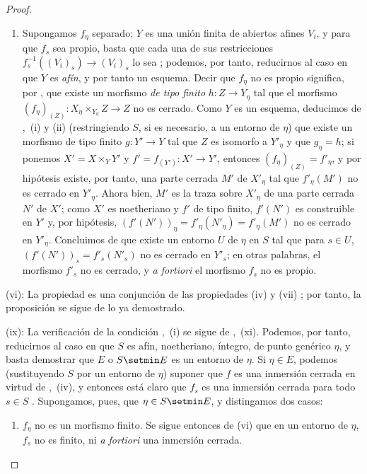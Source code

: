 \begin{proof}
\begin{enumerate}[label=\upshape{$\arabic{enumi}^\circ$}]
  \item Supongamos $f_\eta$ separado; $Y$ es una unión finita de abiertos afines $V_i$, y para que $f_s$ sea propio, basta que cada una de sus restricciones $f_s^{-1}((V_i)_s)\to(V_i)_s$ lo sea ; podemos, por tanto, reducirnos al caso en que $Y$ es \emph{afín}, y por tanto un esquema.
  Decir que $f_\eta$ no es propio significa, por , que existe un morfismo \emph{de tipo finito} $h:Z\to Y_\eta$ tal que el morfismo $(f_\eta)_{(Z)}:X_\eta\times_{Y_\eta} Z\to Z$ no es cerrado.
  Como $Y$ es un esquema, deducimos de ,~(i) y (ii) (restringiendo $S$, si es necesario, a un entorno de $\eta$) que existe un morfismo de tipo finito $g:Y'\to Y$ tal que $Z$ es isomorfo a $Y'_\eta$ y que $g_\eta=h$;
  si ponemos $X'=X\times_Y Y'$ y $f'=f_{(Y')}:X'\to Y'$, entonces $(f_\eta)_{(Z)}=f'_\eta$, y por hipótesis existe, por tanto, una parte cerrada $M'$ de $X'_\eta$ tal que $f'_\eta(M')$ no es cerrado en $Y'_\eta$.
  Ahora bien, $M'$ es la traza sobre $X'_\eta$ de una parte cerrada $N'$ de $X'$; como $X'$ es noetheriano y $f'$ de tipo finito, $f'(N')$ es construible en $Y'$  y, por hipótesis, $(f'(N'))_\eta=f'_\eta(N'_\eta)=f'_\eta(M')$ no es cerrado en $Y'_\eta$.
  Concluimos de  que existe un entorno $U$ de $\eta$ en $S$ tal que para $s\in U$, $(f'(N'))_s=f'_s(N'_s)$ no es cerrado en $Y'_s$; en otras palabras, el morfismo $f'_s$ no es cerrado, y \emph{a fortiori} el morfismo $f_s$ no es propio.
\end{enumerate}

(vi): La propiedad es una conjunción de las propiedades (iv) y (vii) ; por tanto, la proposición se sigue de lo ya demostrado.

(ix): La verificación de la condición ,~(i) se sigue de ,~(xi).
Podemos, por tanto, reducirnos al caso en que $S$ es afín, noetheriano, íntegro, de punto genérico $\eta$, y basta demostrar que $E$ o $S\setmin E$ es un entorno de $\eta$.
Si $\eta\in E$, podemos (sustituyendo $S$ por un entorno de $\eta$) suponer que $f$ es una inmersión cerrada en virtud de ,~(iv), y entonces está claro que $f_s$ es una inmersión cerrada para todo $s\in S$ .
Supongamos, pues, que $\eta\in S\setmin E$, y distingamos dos casos:
\begin{enumerate}[label=\upshape{$\arabic{enumi}^\circ$}]
  \item $f_\eta$ no es un morfismo finito.
  Se sigue entonces de (vi) que en un entorno de $\eta$, $f_s$ no es finito, ni \emph{a fortiori} una inmersión cerrada.


\end{enumerate}
\end{proof}
